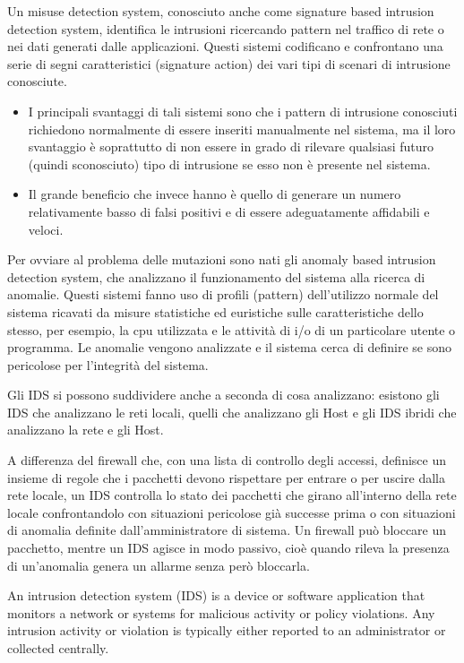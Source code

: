 Un misuse detection system, conosciuto anche come signature based intrusion detection system, 
identifica le intrusioni ricercando pattern nel traffico di rete o nei dati generati dalle applicazioni.
Questi sistemi codificano e confrontano una serie di segni caratteristici (signature action) dei vari tipi di scenari di intrusione conosciute.
\begin{itemize}
    \item I principali svantaggi di tali sistemi sono che i pattern di intrusione conosciuti richiedono normalmente di essere 
    inseriti manualmente nel sistema, ma il loro svantaggio è soprattutto di non essere in grado di rilevare qualsiasi futuro 
    (quindi sconosciuto) tipo di intrusione se esso non è presente nel sistema.
    \item Il grande beneficio che invece hanno è quello di generare un numero relativamente basso di falsi positivi e 
    di essere adeguatamente affidabili e veloci.
\end{itemize}

Per ovviare al problema delle mutazioni sono nati gli anomaly based intrusion detection system, 
che analizzano il funzionamento del sistema alla ricerca di anomalie. 
Questi sistemi fanno uso di profili (pattern) dell'utilizzo normale del sistema ricavati da misure statistiche ed euristiche 
sulle caratteristiche dello stesso, per esempio, la cpu utilizzata e le attività di i/o di un particolare utente o programma. 
Le anomalie vengono analizzate e il sistema cerca di definire se sono pericolose per l'integrità del sistema.

Gli IDS si possono suddividere anche a seconda di cosa analizzano: 
esistono gli IDS che analizzano le reti locali, quelli che analizzano gli Host e gli IDS ibridi che analizzano la rete e gli Host.


A differenza del firewall che, con una lista di controllo degli accessi, definisce un insieme di regole che i pacchetti devono 
rispettare per entrare o per uscire dalla rete locale, un IDS controlla lo stato dei pacchetti che 
girano all'interno della rete locale confrontandolo con situazioni pericolose già successe prima o 
con situazioni di anomalia definite dall'amministratore di sistema.
Un firewall può bloccare un pacchetto, mentre un IDS agisce in modo passivo, cioè quando rileva la 
presenza di un'anomalia genera un allarme senza però bloccarla.

An intrusion detection system (IDS) is a device or software application that monitors a network or 
systems for malicious activity or policy violations.
Any intrusion activity or violation is typically either reported to an administrator or collected centrally.


